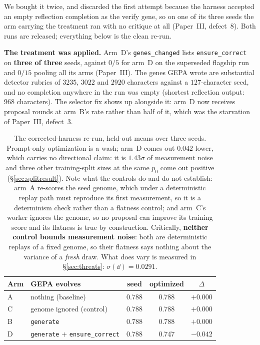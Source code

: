 \documentclass[11pt]{article}
\begin{document}
We bought it twice, and discarded the first attempt because the harness accepted an empty
reflection completion as the verify gene, so on one of its three seeds the arm carrying the
treatment ran with no critique at all (Paper~III, defect~8). Both runs are released; everything
below is the clean re-run.

\textbf{The treatment was applied.} Arm~D's \texttt{genes\_changed} lists
\texttt{ensure\_correct} on \textbf{three of three} seeds, against $0/5$ for arm~D on the
superseded flagship run and $0/15$ pooling all its arms (Paper~III). The genes GEPA wrote are substantial detector rubrics of $3235$,
$3022$ and $2920$ characters against a $127$-character seed, and no completion anywhere in
the run was empty (shortest reflection output: $968$ characters). The selector fix shows up
alongside it: arm~D now receives proposal rounds at arm~B's rate rather than half of it,
which was the starvation of Paper~III, defect~3.

\begin{table}[h]
\centering
\begin{tabular}{llccc}
\toprule
Arm & GEPA evolves & seed & optimized & $\Delta$ \\
\midrule
A & nothing (baseline) & 0.788 & 0.788 & $+0.000$ \\
C & genome ignored (control) & 0.788 & 0.788 & $+0.000$ \\
B & \texttt{generate} & 0.788 & 0.788 & $\mathbf{+0.000}$ \\
D & \texttt{generate} $+$ \texttt{ensure\_correct} & 0.788 & 0.747 & $\mathbf{-0.042}$ \\
\bottomrule
\end{tabular}
\caption{The corrected-harness re-run, held-out means over three seeds. Prompt-only
optimization is a wash; arm~D comes out $0.042$ lower, which carries no directional claim: it
is $1.43\sigma$ of measurement noise and three other training-split sizes at the same $p_0$ come
out positive (\S\ref{sec:splitresult}). Note what the controls do and do not establish: arm~A re-scores the seed genome,
which under a deterministic replay path must reproduce its first measurement, so it is a
determinism check rather than a flatness control; and arm~C's worker ignores the genome, so no
proposal can improve its training score and its flatness is true by construction. Critically,
\textbf{neither control bounds measurement noise}: both are deterministic replays of a fixed
genome, so their flatness says nothing about the variance of a \emph{fresh} draw. What does vary
is measured in \S\ref{sec:threats}: $\sigma(\dd) = 0.0291$.}
\label{tab:rerun}
\end{table}
\end{document}
